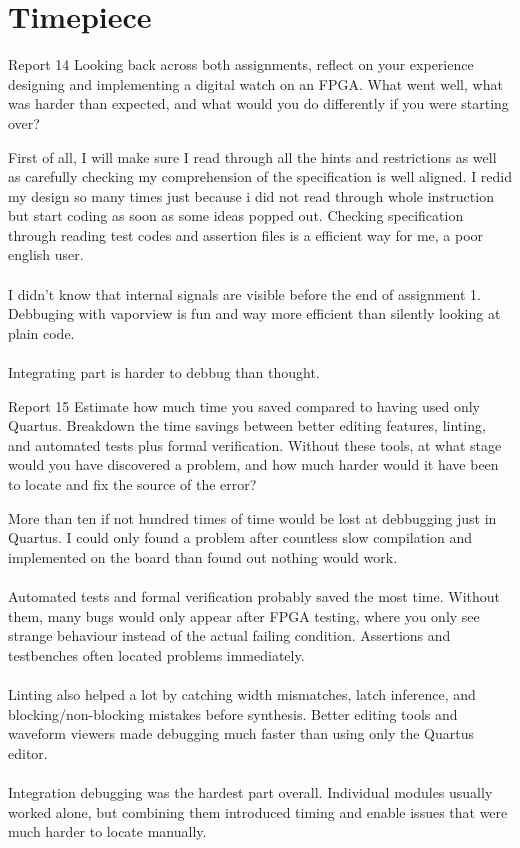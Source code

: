 \documentclass[12pt]{article}
\begin{document}
\section{Timepiece}
	\begin{reportbox}{Report 14}
		Looking back across both assignments, reflect on your experience designing and implementing a digital watch on an FPGA. What went well, what was harder than expected, and what would you do differently if you were starting over?
	\end{reportbox}
	First of all, I will make sure I read through all the hints and restrictions as well as carefully checking my comprehension of the specification is well aligned. I redid my design so many times just because i did not read through whole instruction but start coding as soon as some ideas popped out. Checking specification through reading test codes and assertion files is a efficient way for me, a poor english user. \\
	\\
	I didn't know that internal signals are visible before the end of assignment 1. Debbuging with vaporview is fun and  way more efficient than silently looking at plain code.\\
	\\
	Integrating part is harder to debbug than thought.\\
	\begin{reportbox}{Report 15}
		Estimate how much time you saved compared to having used only Quartus. Breakdown the time savings between better editing features, linting, and automated tests plus formal verification. Without these tools, at what stage would you have discovered a problem, and how much harder would it have been to locate and fix the source of the error?
	\end{reportbox}
	More than ten if not hundred times of time would be lost at debbugging just in Quartus. I could only found a problem after countless slow compilation and implemented on the board than found out nothing would work.\\
	\\
	Automated tests and formal verification probably saved the most time. Without them, many bugs would only appear after FPGA testing, where you only see strange behaviour instead of the actual failing condition. Assertions and testbenches often located problems immediately.\\
	\\
	Linting also helped a lot by catching width mismatches, latch inference, and blocking/non-blocking mistakes before synthesis. Better editing tools and waveform viewers made debugging much faster than using only the Quartus editor.\\
	\\
	Integration debugging was the hardest part overall. Individual modules usually worked alone, but combining them introduced timing and enable issues that were much harder to locate manually.\\
\end{document}
